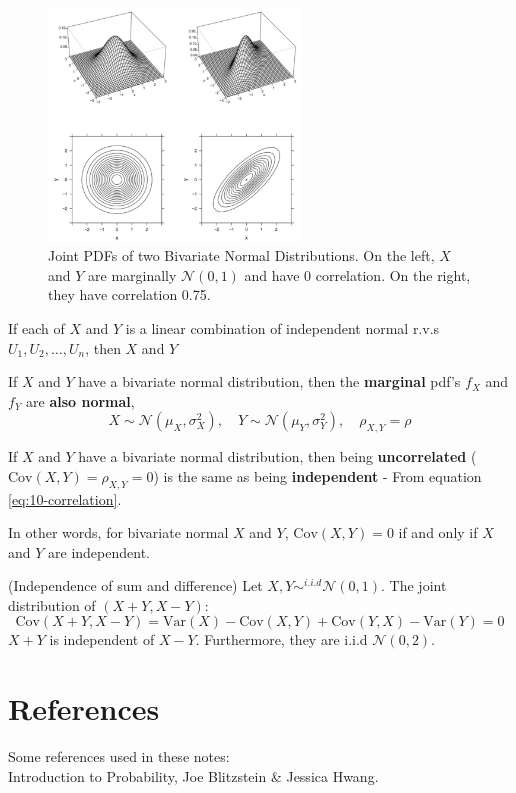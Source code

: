 \documentclass{article}
\begin{document}
\begin{figure}[H]
    \centering
    \includegraphics[width=0.6\textwidth]{Images/bivariatenormal.png}
    \caption{Joint PDFs of two Bivariate Normal Distributions. On the left, $X$ and $Y$ are marginally $\mathcal{N}(0,1)$ and have 0 correlation. On the right, they have correlation 0.75.}
    \label{fig:10-bivariatenormal}
\end{figure} 

\begin{theorem}
    If each of $X$ and $Y$ is a linear combination of independent normal r.v.s $U_{1}, U_{2}, \dots, U_n$, then $X$ and $Y$  
\end{theorem}

\begin{theorem}
    If $X$ and $Y$ have a bivariate normal distribution, then the \textbf{marginal} pdf's $f_X$ and $f_Y$ are \textbf{also normal}, \begin{equation*}
        X \sim \mathcal{N}(\mu_X, \sigma_X^{2}), \quad Y \sim \mathcal{N}(\mu_Y, \sigma^{2}_Y), \quad \rho_{X,Y} = \rho
    \end{equation*} 
\end{theorem}


\begin{theorem}
    If $X$ and $Y$ have a bivariate normal distribution, then being \textbf{uncorrelated} ($\text{Cov}(X,Y) = \rho_{X,Y} = 0$) is the same as being \textbf{independent} - From equation \ref{eq:10-correlation}. 
\end{theorem}

\noindent In other words, for bivariate normal $X$ and $Y$, $\text{Cov}(X,Y) = 0$ if and only if $X$ and $Y$ are independent. 

\begin{theorem}
    (Independence of sum and difference) Let $X, Y \sim^{i.i.d} \mathcal{N}(0,1)$. The joint distribution of $(X + Y, X - Y)$: \begin{equation*}
        \text{Cov}(X + Y, X-Y) = \text{Var}(X) - \text{Cov}(X,Y) + \text{Cov}(Y,X) - \text{Var}(Y) = 0
    \end{equation*}
    \noindent $X + Y$ is independent of $X - Y$. Furthermore, they are i.i.d $\mathcal{N}(0,2)$. 
\end{theorem}


\newpage 

\section*{References}

Some references used in these notes: \\ 

Introduction to Probability, Joe Blitzstein \& Jessica Hwang. 
\end{document}
